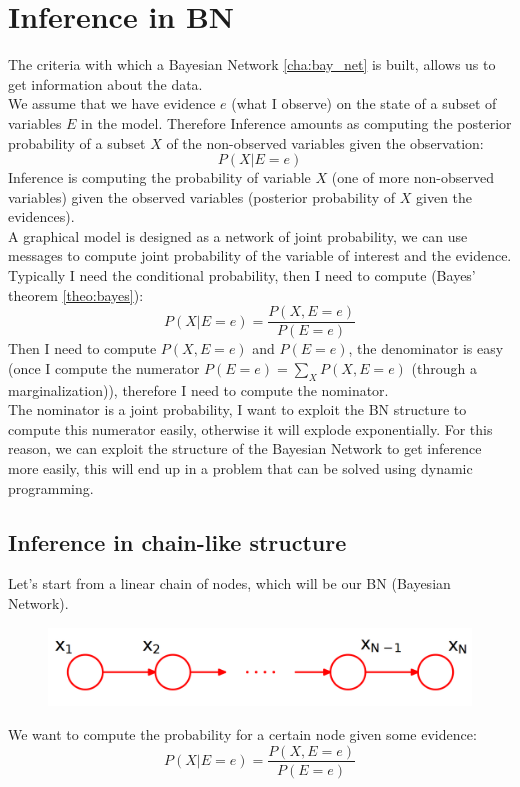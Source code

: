 \chapter{Inference in BN}
\label{cha:inter_BN}

The criteria with which a Bayesian Network \ref{cha:bay_net} is built, allows us to get information about the data.\\

We assume that we have evidence $e$ (what I observe) on the state of a subset of variables $E$ in the model. Therefore Inference amounts as computing the posterior probability of a subset $X$ of the non-observed variables given the observation:
$$P(X|E = e)$$
Inference is computing the probability of variable $X$ (one of more non-observed variables) given the observed variables (posterior probability of $X$ given the evidences).\\

A graphical model is designed as a network of joint probability, we can use messages to compute joint probability of the variable of interest and the evidence. Typically I need the conditional probability, then I need to compute (Bayes' theorem \ref{theo:bayes}):
$$P(X | E = e) = \frac{P(X, E=e)}{P(E=e)}$$
Then I need to compute $P(X, E=e)$ and $P(E=e)$, the denominator is easy (once I compute the numerator $P(E=e) = \sum_{X} P(X, E=e)$ (through a marginalization)), therefore I need to compute the nominator.\\
The nominator is a joint probability, I want to exploit the BN structure to compute this numerator easily, otherwise it will explode exponentially.
For this reason, we can exploit the structure of the Bayesian Network to get inference more easily, this will end up in a problem that can be solved using dynamic programming.

\section{Inference in chain-like structure}
    Let's start from a linear chain of nodes, which will be our BN (Bayesian Network).
    \begin{figure}[H]
        \centering
        \includegraphics[scale=0.3]{images/chain_inference_bn.png}
    \end{figure}
    We want to compute the probability for a certain node given some evidence:
    $$P(X| E=e) = \frac{P(X, E=e)}{P(E=e)}$$
    
